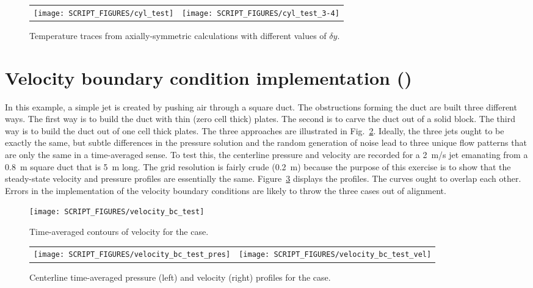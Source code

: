 \documentclass[11pt]{book}
\begin{document}
\begin{figure}[!ht]
\begin{tabular*}{\textwidth}{lr}
\texttt{[image: SCRIPT\_FIGURES/cyl\_test]} &
\texttt{[image: SCRIPT\_FIGURES/cyl\_test\_3-4]}
\end{tabular*}
\caption[The  test cases]{Temperature traces from axially-symmetric calculations with different values of $\delta y$.}
\label{cyl_test_fig}
\end{figure}


\newpage

\section{Velocity boundary condition implementation (\texorpdfstring{}{velocity\_bc\_test})}
\label{velocity_bc_test}

In this example, a simple jet is created by pushing air through a square duct. The obstructions forming the duct are built three different ways. The first way is to build the duct with thin (zero cell thick) plates. The second is to carve the duct out of a solid block. The third way is to build the duct out of one cell thick plates. The three approaches are illustrated in Fig.~\ref{velocity_bc_test_image}. Ideally, the three jets ought to be exactly the same, but subtle differences in the pressure solution and the random generation of noise lead to three unique flow patterns that are only the same in a time-averaged sense. To test this, the centerline pressure and velocity are recorded for a 2~m/s jet emanating from a 0.8~m square duct that is 5~m long. The grid resolution is fairly crude (0.2~m) because the purpose of this exercise is to show that the steady-state velocity and pressure profiles are essentially the same. Figure~\ref{velocity_bc_test_plot} displays the profiles. The curves ought to overlap each other. Errors in the implementation of the velocity boundary conditions are likely to throw the three cases out of alignment.

\begin{figure}[!ht]
\centering
\texttt{[image: SCRIPT\_FIGURES/velocity\_bc\_test]}
\caption[Images of the  test case]{Time-averaged contours of velocity for the  case.}
\label{velocity_bc_test_image}
\end{figure}

\begin{figure}[!ht]
\begin{tabular*}{\textwidth}{lr}
\texttt{[image: SCRIPT\_FIGURES/velocity\_bc\_test\_pres]} &
\texttt{[image: SCRIPT\_FIGURES/velocity\_bc\_test\_vel]}
\end{tabular*}
\caption[The  test case]{Centerline time-averaged pressure (left) and velocity (right) profiles for the  case.}
\label{velocity_bc_test_plot}
\end{figure}
\end{document}
